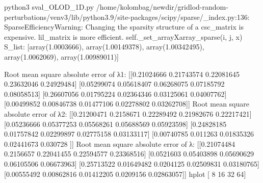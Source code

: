 python3 sval_OLOD_1D.py
/home/kolombag/newdir/gridlod-random-perturbations/venv3/lib/python3.9/site-packages/scipy/sparse/_index.py:136: SparseEfficiencyWarning: Changing the sparsity structure of a csc_matrix is expensive. lil_matrix is more efficient.
  self._set_arrayXarray_sparse(i, j, x)
S_list:
[array(1.0003666), array(1.00149378), array(1.00342495), array(1.0062069), array(1.00989011)]

Root mean square absolute error of λ1:
 [[0.21024666 0.21743574 0.22081645 0.23632046 0.24929484]
 [0.05299074 0.05618407 0.06268075 0.07185792 0.08058513]
 [0.26607056 0.01795224 0.02364346 0.03125061 0.04007762]
 [0.00499852 0.00846738 0.01477106 0.02278802 0.03262708]]
Root mean square absolute error of λ2: 
 [[0.21200471 0.2158671  0.22289492 0.21982676 0.22217421]
 [0.05236666 0.05377253 0.05568261 0.05688569 0.05923598]
 [0.24828185 0.01757842 0.02299897 0.02775158 0.03133117]
 [0.00740785 0.011263   0.01835326 0.02441673 0.030728  ]]
Root mean square absolute error of λ: 
 [[0.21074484 0.2156657  0.22041455 0.22594577 0.23368516]
 [0.0521603  0.05403898 0.05690629 0.06105506 0.06673963]
 [0.25713522 0.01649482 0.0204125  0.02509831 0.03180765]
 [0.00555492 0.00862816 0.01412205 0.0209156  0.02863057]]
hplot [ 8 16 32 64]